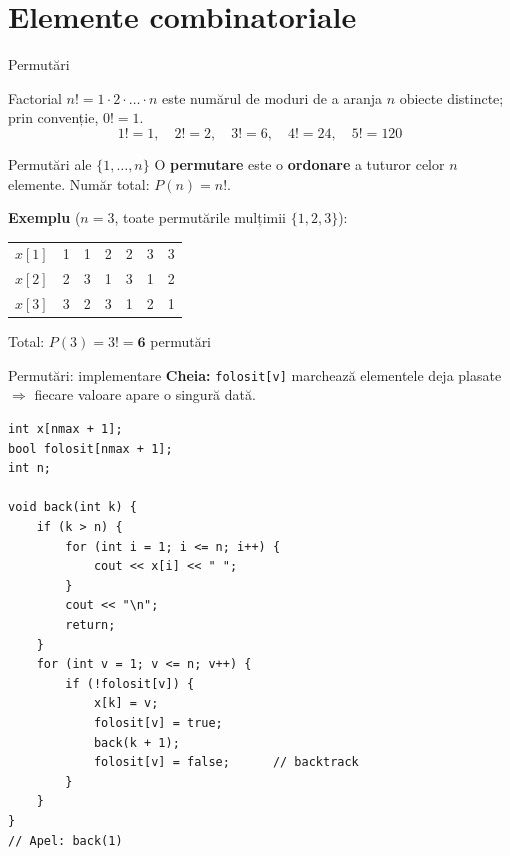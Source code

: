 \documentclass[8pt,mathserif]{beamer}
\begin{document}
\section{Elemente combinatoriale}

\begin{frame}{Permutări}
  \begin{block}{Factorial}
    $n! = 1 \cdot 2 \cdot \ldots \cdot n$ este numărul de moduri de a aranja $n$ obiecte distincte; prin convenție, $0! = 1$.
    \[ 1! = 1,\quad 2! = 2,\quad 3! = 6,\quad 4! = 24,\quad 5! = 120 \]
  \end{block}
  \begin{block}{Permutări ale $\{1, \ldots, n\}$}
    O \textbf{permutare} este o \textbf{ordonare} a tuturor celor $n$ elemente. Număr total: $P(n) = n!$.
  \end{block}
  \smallskip
  \textbf{Exemplu} ($n = 3$, toate permutările mulțimii $\{1,2,3\}$):
  \smallskip

  \centering
  \begin{tabular}{@{}ccccccc@{}}
    \toprule
    $x[1]$ & 1 & 1 & 2 & 2 & 3 & 3 \\
    $x[2]$ & 2 & 3 & 1 & 3 & 1 & 2 \\
    $x[3]$ & 3 & 2 & 3 & 1 & 2 & 1 \\
    \bottomrule
  \end{tabular}

  \smallskip
  \raggedright Total: $P(3) = 3! = \mathbf{6}$ permutări
\end{frame}

\begin{frame}[fragile]{Permutări: implementare}
  \textbf{Cheia:} \texttt{folosit[v]} marchează elementele deja plasate $\Rightarrow$ fiecare valoare apare o singură dată.
  \begin{lstlisting}
int x[nmax + 1];
bool folosit[nmax + 1];
int n;

void back(int k) {
    if (k > n) {
        for (int i = 1; i <= n; i++) {
            cout << x[i] << " ";
        }
        cout << "\n";
        return;
    }
    for (int v = 1; v <= n; v++) {
        if (!folosit[v]) {
            x[k] = v;
            folosit[v] = true;
            back(k + 1);
            folosit[v] = false;      // backtrack
        }
    }
}
// Apel: back(1)
  \end{lstlisting}
\end{frame}
\end{document}
